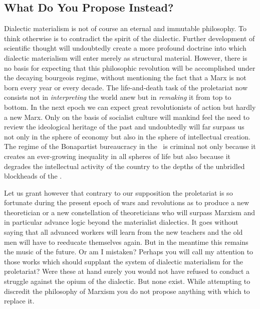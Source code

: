 \subsection*{What Do You Propose Instead?}

Dialectic materialism is not of course an eternal and immutable philosophy. To think otherwise is to contradict the spirit of the dialectic. Further development of scientific thought will undoubtedly create a more profound doctrine into which dialectic materialism will enter merely as structural material. However, there is no basis for expecting that this philosophic revolution will be accomplished under the decaying bourgeois regime, without mentioning the fact that a Marx is not born every year or every decade. The life-and-death task of the proletariat now consists not in \emph{interpreting} the world anew but in \emph{remaking} it from top to bottom. In the next epoch we can expect great revolutionists of action but hardly a new Marx. Only on the basis of socialist culture will mankind feel the need to review the ideological heritage of the past and undoubtedly will far surpass us not only in the sphere of economy but also in the sphere of intellectual creation. The regime of the Bonapartist bureaucracy in the \USSR\ is criminal not only because it creates an ever-growing inequality in all spheres of life but also because it degrades the intellectual activity of the country to the depths of the unbridled blockheads of the \GPU.

Let us grant however that contrary to our supposition the proletariat is so fortunate during the present epoch of wars and revolutions as to produce a new theoretician or a new constellation of theoreticians who will surpass Marxism and in particular advance logic beyond the materialist dialectics. It goes without saying that all advanced workers will learn from the new teachers and the old men will have to reeducate themselves again. But in the meantime this remains the music of the future. Or am I mistaken? Perhaps you will call my attention to those works which should supplant the system of dialectic materialism for the proletariat? Were these at hand surely you would not have refused to conduct a struggle against the opium of the dialectic. But none exist. While attempting to discredit the philosophy of Marxism you do not propose anything with which to replace it.

